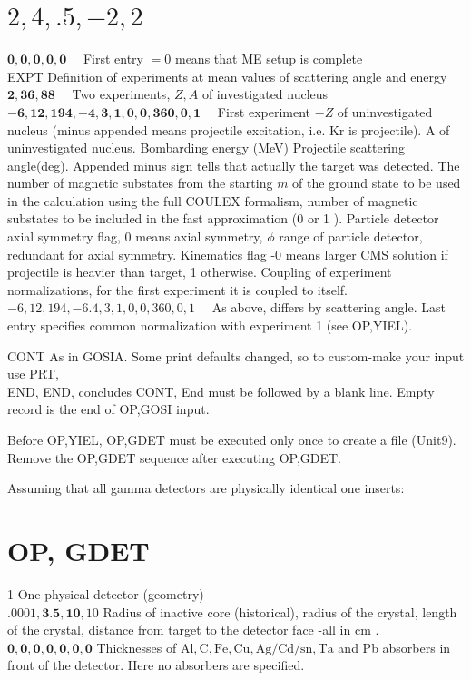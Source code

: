 \documentclass[10pt]{article}
\begin{document}
\section*{$2,4, .5,-2,2$}
$\mathbf{0}, \mathbf{0}, \mathbf{0}, \mathbf{0}, \mathbf{0} \quad$ First entry $=0$ means that ME setup is complete\\
EXPT Definition of experiments at mean values of scattering angle and energy\\
$\mathbf{2 , 3 6}, \mathbf{8 8} \quad$ Two experiments, $Z, A$ of investigated nucleus\\
$-\mathbf{6}, \mathbf{1 2}, \mathbf{1 9 4},-\mathbf{4}, \mathbf{3}, \mathbf{1}, \mathbf{0}, \mathbf{0}, \mathbf{3 6 0}, \mathbf{0}, \mathbf{1} \quad$ First experiment $-Z$ of uninvestigated nucleus (minus appended means projectile excitation, i.e. Kr is projectile). A of uninvestigated nucleus. Bombarding energy (MeV) Projectile scattering angle(deg). Appended minus sign tells that actually the target was detected. The number of magnetic substates from the starting $m$ of the ground state to be used in the calculation using the full COULEX formalism, number of magnetic substates to be included in the fast approximation (0 or 1 ). Particle detector axial symmetry flag, 0 means axial symmetry, $\phi$ range of particle detector, redundant for axial symmetry. Kinematics flag -0 means larger CMS solution if projectile is heavier than target, 1 otherwise. Coupling of experiment normalizations, for the first experiment it is coupled to itself.\\
$-6,12,194,-6.4,3,1,0,0,360,0,1 \quad$ As above, differs by scattering angle. Last entry specifies common normalization with experiment 1 (see OP,YIEL).

CONT As in GOSIA. Some print defaults changed, so to custom-make your input use PRT,\\
END, END, concludes CONT, End must be followed by a blank line. Empty record is the end of OP,GOSI input.

Before OP,YIEL, OP,GDET must be executed only once to create a file (Unit9). Remove the OP,GDET sequence after executing OP,GDET.

Assuming that all gamma detectors are physically identical one inserts:

\section*{OP, GDET}
1 One physical detector (geometry)\\
$.0001, \mathbf{3 . 5}, \mathbf{1 0}, 10$ Radius of inactive core (historical), radius of the crystal, length of the crystal, distance from target to the detector face -all in cm .\\
$\mathbf{0}, \mathbf{0}, \mathbf{0}, \mathbf{0}, \mathbf{0}, \mathbf{0}, \mathbf{0}$ Thicknesses of $\mathrm{Al}, \mathrm{C}, \mathrm{Fe}, \mathrm{Cu}, \mathrm{Ag} / \mathrm{Cd} / \mathrm{sn}, \mathrm{Ta}$ and Pb absorbers in front of the detector. Here no absorbers are specified.
\end{document}
